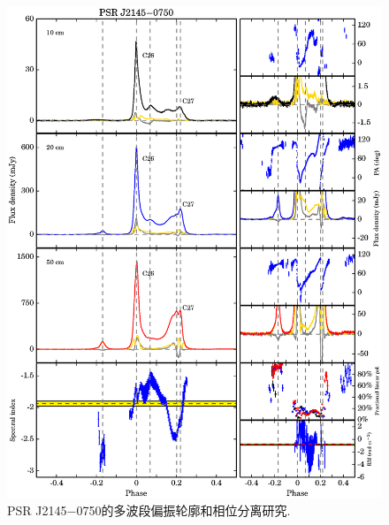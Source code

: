 \begin{figure}
\begin{center}
\includegraphics[width=6 in]{2145.ps}
\caption{PSR J2145$-$0750的多波段偏振轮廓和相位分离研究.}
\label{2145}
\end{center}
\end{figure}

